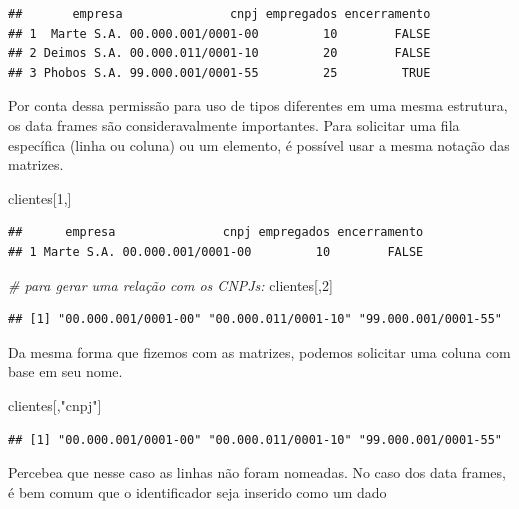 \documentclass[
]{book}
\newenvironment{Shaded}{\begin{snugshade}}{\end{snugshade}}
\newcommand{\CommentTok}[1]{\textcolor[rgb]{0.56,0.35,0.01}{\textit{#1}}}
\newcommand{\DecValTok}[1]{\textcolor[rgb]{0.00,0.00,0.81}{#1}}
\newcommand{\NormalTok}[1]{#1}
\newcommand{\StringTok}[1]{\textcolor[rgb]{0.31,0.60,0.02}{#1}}
\begin{document}
\begin{verbatim}
##       empresa               cnpj empregados encerramento
## 1  Marte S.A. 00.000.001/0001-00         10        FALSE
## 2 Deimos S.A. 00.000.011/0001-10         20        FALSE
## 3 Phobos S.A. 99.000.001/0001-55         25         TRUE
\end{verbatim}

Por conta dessa permissão para uso de tipos diferentes em uma mesma estrutura, os data frames são consideravalmente importantes. Para solicitar uma fila específica (linha ou coluna) ou um elemento, é possível usar a mesma notação das matrizes.

\begin{Shaded}
\begin{Highlighting}[]
\NormalTok{clientes[}\DecValTok{1}\NormalTok{,]}
\end{Highlighting}
\end{Shaded}

\begin{verbatim}
##      empresa               cnpj empregados encerramento
## 1 Marte S.A. 00.000.001/0001-00         10        FALSE
\end{verbatim}

\begin{Shaded}
\begin{Highlighting}[]
\CommentTok{\# para gerar uma relação com os CNPJs:}
\NormalTok{clientes[,}\DecValTok{2}\NormalTok{]}
\end{Highlighting}
\end{Shaded}

\begin{verbatim}
## [1] "00.000.001/0001-00" "00.000.011/0001-10" "99.000.001/0001-55"
\end{verbatim}

Da mesma forma que fizemos com as matrizes, podemos solicitar uma coluna com base em seu nome.

\begin{Shaded}
\begin{Highlighting}[]
\NormalTok{clientes[,}\StringTok{"cnpj"}\NormalTok{]}
\end{Highlighting}
\end{Shaded}

\begin{verbatim}
## [1] "00.000.001/0001-00" "00.000.011/0001-10" "99.000.001/0001-55"
\end{verbatim}

Percebea que nesse caso as linhas não foram nomeadas. No caso dos data frames, é bem comum que o identificador seja inserido como um dado
\end{document}
